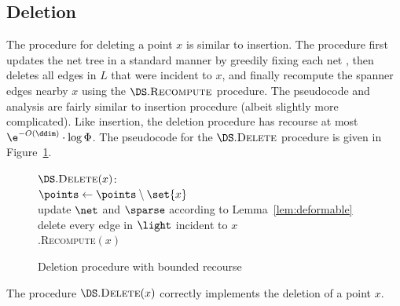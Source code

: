 \subsection{Deletion}
The procedure for deleting a point $x$ is similar to insertion. The procedure  first updates the net tree in a standard manner by greedily fixing each net \cite{gao2004deformable,KL04}, then deletes all edges in $L$ that were incident to $x$, and finally recompute the spanner edges nearby $x$ using the $\DS.\textsc{Recompute}$ procedure. The pseudocode and analysis are fairly similar to insertion procedure (albeit slightly more complicated).
Like insertion, the deletion procedure has recourse at most $\e^{-O(\ddim)} \cdot \log \Phi$. 
% 
The pseudocode for the $\DS.\textsc{Delete}$ procedure is given in Figure~\ref{fig:delete-recourse}.
%
\begin{figure}[h!]
\centering
\begin{algorithm}
    \ul{$\DS.\textsc{Delete}(x)$}:\+
    \\ $\points \gets \points \setminus \set{x}$
    \\ update $\net$ and $\sparse$ according to Lemma~\ref{lem:deformable}
    \\ delete every edge in $\light$ incident to $x$
    \\ \DS.\textsc{Recompute}$(x)$
\end{algorithm}
\caption{Deletion procedure with bounded recourse}
\label{fig:delete-recourse}
\end{figure}
%
%
\begin{lemma}
\label{lem:delete-invariants}
The procedure $\DS.\textsc{Delete}(x)$ correctly implements the deletion of a point $x$.    
\end{lemma}
